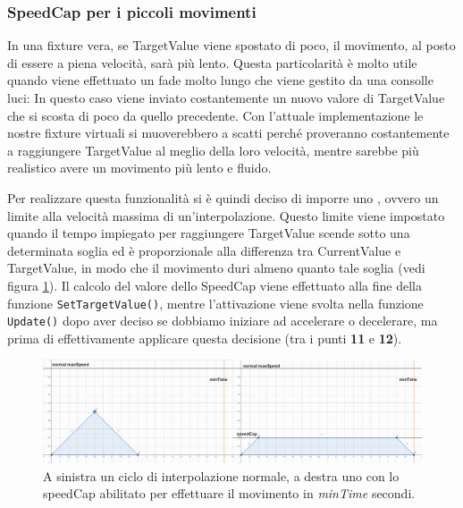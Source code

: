 \documentclass[main.tex]{subfiles}
\begin{document}
\subsubsection{SpeedCap per i piccoli movimenti}\label{subsubsec:4_2_Speedcap}
In una fixture vera, se TargetValue viene spostato di poco, il movimento, al posto di essere a piena velocità, sarà più lento. Questa particolarità è molto utile quando viene effettuato un fade molto lungo che viene gestito da una consolle luci: In questo caso viene inviato costantemente un nuovo valore di TargetValue che si scosta di poco da quello precedente. Con l'attuale implementazione le nostre fixture virtuali si muoverebbero a scatti perché proveranno costantemente a raggiungere TargetValue al meglio della loro velocità, mentre sarebbe più realistico avere un movimento più lento e fluido. 

Per realizzare questa funzionalità si è quindi deciso di imporre uno , ovvero un limite alla velocità massima di un'interpolazione. Questo limite viene impostato quando il tempo impiegato per raggiungere TargetValue scende sotto una determinata soglia ed è proporzionale alla differenza tra CurrentValue e TargetValue, in modo che il movimento duri almeno quanto tale soglia (vedi figura \ref{fig:4_speedCapIntro}). Il calcolo del valore dello SpeedCap viene effettuato alla fine della funzione \lstinline{SetTargetValue()}, mentre l'attivazione viene svolta nella funzione \lstinline{Update()} dopo aver deciso se dobbiamo iniziare ad accelerare o decelerare, ma prima di effettivamente applicare questa decisione (tra i punti \textbf{11} e \textbf{12}). \newline
\begin{figure}[H]
    \centering
    \includegraphics[width=1\linewidth]{img/interpolazione/speedCapIntro.png}
    \caption{A sinistra un ciclo di interpolazione normale, a destra uno con lo speedCap abilitato per effettuare il movimento in \textit{minTime} secondi.}
    \label{fig:4_speedCapIntro}
\end{figure}
\end{document}
